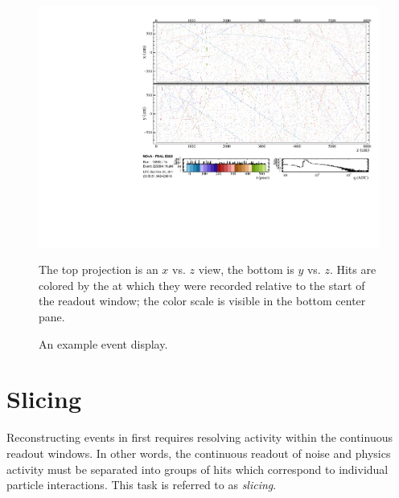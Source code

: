 \begin{figure}[t]
\begin{center}
\includegraphics[width=\textwidth]{figures/evd/evd_14db.pdf}
\end{center}
\caption{An example \nova event display.}{
The top projection is an $x$ vs. $z$ view, the bottom is $y$ vs. $z$.
Hits are colored by the at which they were recorded relative to the start of
the readout window; the color scale is visible in the bottom center pane.}
\label{eventDisplay14}
\end{figure}

\section{Slicing}
\label{slicer_section}

Reconstructing events in \nova first requires resolving activity within the
continuous readout windows.
In other words, the continuous readout of noise and physics activity must be
separated into groups of hits which correspond to individual particle
interactions.
This task is referred to as \textit{slicing}.

